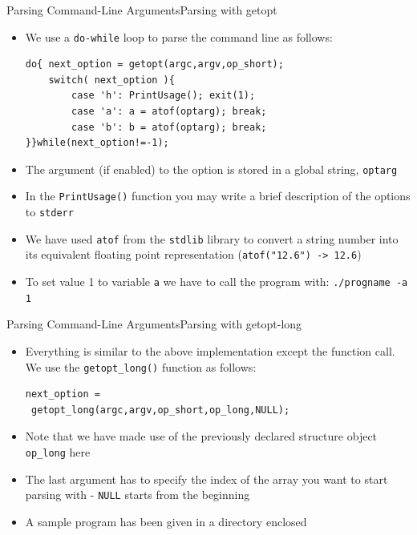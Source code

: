 \documentclass{beamer}
\begin{document}
\begin{frame}[fragile]{Parsing Command-Line Arguments}{Parsing with getopt}
\begin{itemize}
\item We use a \verb|do-while| loop to parse the command line as follows:
\begin{verbatim}
do{ next_option = getopt(argc,argv,op_short);
    switch( next_option ){
        case 'h': PrintUsage(); exit(1);
        case 'a': a = atof(optarg); break;
        case 'b': b = atof(optarg); break;
}}while(next_option!=-1);
\end{verbatim}
\item The argument (if enabled) to the option is stored in a global string, \verb|optarg|
\item In the \verb|PrintUsage()| function you may write a brief description of the options to \verb|stderr|
\item We have used \verb|atof| from the \verb|stdlib| library to convert a string number into its equivalent floating point representation (\verb|atof("12.6") -> 12.6|)
\item To set value 1 to variable \verb|a| we have to call the program with: \verb|./progname -a 1|
\end{itemize}
\end{frame}

\begin{frame}[fragile]{Parsing Command-Line Arguments}{Parsing with getopt-long}
\begin{itemize}
\item Everything is similar to the above implementation except the function call. We use the \verb|getopt_long()| function as follows:
\begin{verbatim}
next_option =
 getopt_long(argc,argv,op_short,op_long,NULL);
\end{verbatim}
\item Note that we have made use of the previously declared structure object \verb|op_long| here
\item The last argument has to specify the index of the array you want to start parsing with - \verb|NULL| starts from the beginning
\item A sample program has been given in a directory enclosed
\end{itemize}
\end{frame}
\end{document}
